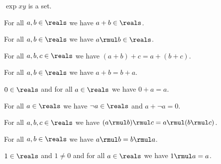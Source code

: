 \begin{signature} \label{sig7}
    $\exp{x}{y}$ is a set.
\end{signature}

\begin{axiom}\label{real_add_closed}
    For all $a, b\in\reals$ we have $a + b\in\reals$.
\end{axiom}

\begin{axiom}\label{real_mul_closed}
    For all $a, b\in\reals$ we have $a \rmul b\in\reals$.
\end{axiom}

\begin{axiom}\label{real_add_assoc}
    For all $a, b, c\in\reals$ we have $(a + b) + c = a + (b + c)$.
\end{axiom}

\begin{axiom}\label{real_add_comm}
    For all $a, b\in\reals$ we have $a + b = b + a$.
\end{axiom}

\begin{axiom}\label{real_add_ident}
    $0\in\reals$ and for all $a\in\reals$ we have $0 + a = a$.
\end{axiom}

\begin{axiom}\label{real_add_inverse}
    For all $a\in\reals$ we have $\neg{a}\in\reals$ and $a + \neg{a} = 0$.
\end{axiom}

\begin{axiom}\label{real_mul_assoc}
    For all $a, b, c\in\reals$ we have $(a \rmul b) \rmul c = a \rmul (b \rmul c)$.
\end{axiom}

\begin{axiom}\label{real_mul_comm}
    For all $a, b\in\reals$ we have $a \rmul b = b \rmul a$.
\end{axiom}

\begin{axiom}\label{real_mul_ident}
    $1\in\reals$ and $1\neq 0$ and for all $a\in\reals$ we have $1 \rmul a = a$.
\end{axiom}

